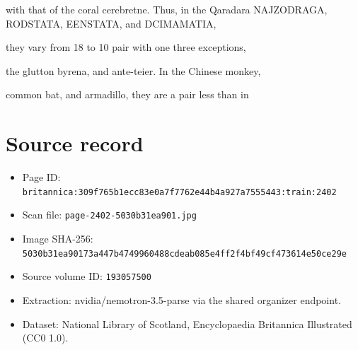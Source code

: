 \documentclass{article}
\begin{document}
with that of the coral cerebretne. Thus, in the Qaradara NAJZODRAGA, RODSTATA, EENSTATA, and DCIMAMATIA,

they vary from 18 to 10 pair with one three exceptions,

the glutton byrena, and ante-teier. In the Chinese monkey,

common bat, and armadillo, they are a pair less than in

\section*{Source record}
\begin{itemize}
\item Page ID: \texttt{britannica:309f765b1ecc83e0a7f7762e44b4a927a7555443:train:2402}
\item Scan file: \texttt{page-2402-5030b31ea901.jpg}
\item Image SHA-256: \texttt{5030b31ea90173a447b4749960488cdeab085e4ff2f4bf49cf473614e50ce29e}
\item Source volume ID: \texttt{193057500}
\item Extraction: nvidia/nemotron-3.5-parse via the shared organizer endpoint.
\item Dataset: National Library of Scotland, Encyclopaedia Britannica Illustrated (CC0 1.0).
\end{itemize}
\end{document}
